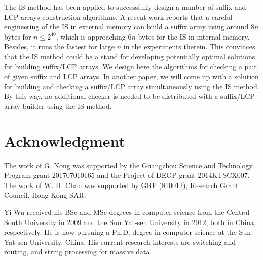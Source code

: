 \documentclass[10pt,journal,compsoc]{IEEEtran}
\begin{document}
The IS method has been applied to successfully design a number of suffix and LCP arrays construction algorithms. A recent work \cite{Karkkainen2017} reports that a careful engineering of the IS in external memory can build a suffix array using around $8n$ bytes for $n\le 2^{40}$, which is approaching $6n$ bytes for the IS in internal memory. Besides, it runs the fastest for large $n$ in the experiments therein. This convinces that the IS method could be a stand for developing potentially optimal solutions for building suffix/LCP arrays. We design here the algorithms for checking a pair of given suffix and LCP arrays. In another paper, we will come up with a solution for building and checking a suffix/LCP array simultaneously using the IS method. By this way, no additional checker is needed to be distributed with a suffix/LCP array builder using the IS method.



\section*{Acknowledgment}
The work of G. Nong was supported by the Guangzhou Science and Technology Program grant 201707010165 and the Project of DEGP grant 2014KTSCX007. The work of W. H. Chan was supported by GRF (810012), Research Grant Council, Hong Kong SAR.





\begin{IEEEbiography}{Yi Wu}
received his BSc and MSc degrees in computer science from the Central-South University in 2009 and the Sun Yat-sen University in 2012, both in China, respectively. He is now pursuing a Ph.D. degree in computer science at the Sun Yat-sen University, China. His current research interests are switching and routing, and string processing for massive data.
\end{IEEEbiography}
\end{document}
